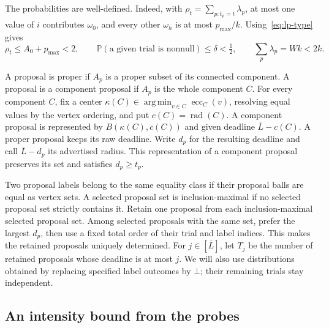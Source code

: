 \documentclass[11pt]{article}
\numberwithin{equation}{section}
\theoremstyle{definition}
\newcommand{\Prob}{\mathbb P}
\newcommand{\ecc}{\operatorname{ecc}}
\newcommand{\rad}{\operatorname{rad}}
\newcommand{\cL}{\overline L}
\DeclareMathOperator*{\argmin}{arg\,min}
\begin{document}
The probabilities are well-defined. Indeed, with
$\rho_t=\sum_{p:t_p=t}\lambda_p$, at most one value of $i$ contributes
$\omega_0$, and every other $\omega_h$ is at most $p_{\max}/k$.
Using~\eqref{eq:lp-type} gives
\begin{equation}\label{eq:trial-bounds}
 \rho_t\le A_0+p_{\max}<2,\qquad
 \Prob(\text{a given trial is nonnull})\le\delta<\tfrac12,
 \qquad \sum_p\lambda_p=Wk<2k.
\end{equation}

A proposal is proper if $A_p$ is a proper subset of its connected
component. A proposal is a component proposal if $A_p$ is the whole
component $C$. For every component $C$, fix a center
$\kappa(C)\in\argmin_{v\in C}\ecc_C(v)$, resolving equal values by the
vertex ordering, and put $c(C)=\rad(C)$.
A component proposal is represented by $B(\kappa(C),c(C))$ and given
deadline $\cL-c(C)$. A proper proposal keeps its raw deadline.
Write $d_p$ for the resulting deadline and call $\cL-d_p$ its
advertised radius. This representation of a
component proposal preserves its set and satisfies $d_p\ge t_p$.

Two proposal labels belong to the same equality class if their proposal
balls are equal as vertex sets. A selected proposal set is
inclusion-maximal if no selected proposal set strictly contains it.
Retain one proposal from each inclusion-maximal selected proposal set. Among
selected proposals with the same set, prefer the largest $d_p$, then use
a fixed total order of their trial and label indices. This makes the
retained proposals uniquely determined. For $j\in[\cL]$, let $T_j$ be
the number of retained proposals whose deadline is at most $j$.
We will also use distributions obtained by replacing specified label
outcomes by $\bot$; their remaining trials stay independent.

\subsection{An intensity bound from the probes}
\end{document}
